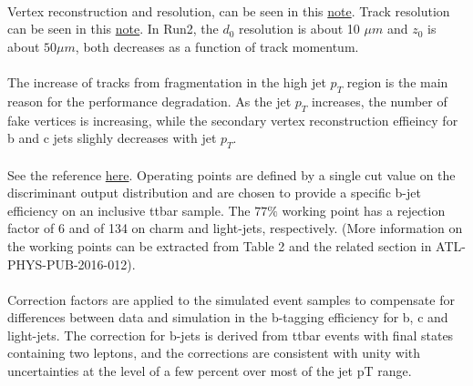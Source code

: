 \paragraph{}
Vertex reconstruction and resolution, can be seen in this \href{http://atlas.web.cern.ch/Atlas/GROUPS/PHYSICS/PUBNOTES/ATL-PHYS-PUB-2015-026/}{note}. Track resolution can be seen in this \href{https://cds.cern.ch/record/2110140/files/ATL-PHYS-PUB-2015-051.pdf}{note}. In Run2, the $d_0$ resolution is about 10 $\mu m$ and $z_0$ is about $50 \mu m$, both decreases as a function of track momentum.


\paragraph{}
The increase of tracks from fragmentation in the high jet $p_T$ region is the main reason for the performance degradation. As the jet $p_T$ increases, the number of fake vertices is increasing, while the secondary vertex reconstruction effieincy for b and c jets slighly decreases with jet $p_T$.

\paragraph{}
See the reference \href{https://twiki.cern.ch/twiki/bin/viewauth/AtlasProtected/BTaggingPaperRecommendations}{here}. Operating points are defined by a single cut value on the discriminant output distribution and are chosen to provide a specific b-jet efficiency on an inclusive ttbar sample. The $77\%$ working point has a rejection factor of 6 and of 134 on charm and light-jets, respectively. (More information on the working points can be extracted from Table 2 and the related section in ATL-PHYS-PUB-2016-012).

\paragraph{}
Correction factors are applied to the simulated event samples to compensate for differences between data and simulation in the b-tagging efficiency for b, c and light-jets. The correction for b-jets is derived from ttbar events with final states containing two leptons, and the corrections are consistent with unity with uncertainties at the level of a few percent over most of the jet pT range.

